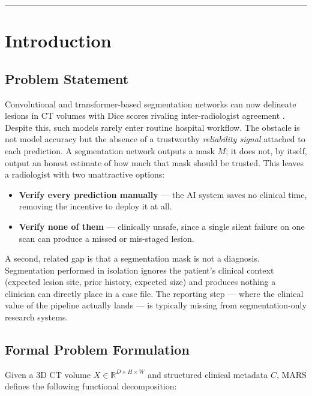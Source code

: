 \documentclass[11pt,a4paper]{article}
\begin{document}
\tableofcontents
\vspace{1em}
\hrule

\section{Introduction}
\label{sec:intro}

\subsection{Problem Statement}
Convolutional and transformer-based segmentation networks can now delineate lesions in CT volumes with Dice scores rivaling inter-radiologist agreement \cite{sam,sam2}. Despite this, such models rarely enter routine hospital workflow. The obstacle is not model accuracy but the absence of a trustworthy \emph{reliability signal} attached to each prediction. A segmentation network outputs a mask $M$; it does not, by itself, output an honest estimate of how much that mask should be trusted. This leaves a radiologist with two unattractive options:

\begin{itemize}[leftmargin=1.4em]
    \item \textbf{Verify every prediction manually} --- the AI system saves no clinical time, removing the incentive to deploy it at all.
    \item \textbf{Verify none of them} --- clinically unsafe, since a single silent failure on one scan can produce a missed or mis-staged lesion.
\end{itemize}

A second, related gap is that a segmentation mask is not a diagnosis. Segmentation performed in isolation ignores the patient's clinical context (expected lesion site, prior history, expected size) and produces nothing a clinician can directly place in a case file. The reporting step --- where the clinical value of the pipeline actually lands --- is typically missing from segmentation-only research systems.

\subsection{Formal Problem Formulation}
Given a 3D CT volume $X \in \mathbb{R}^{D\times H\times W}$ and structured clinical metadata $C$, MARS defines the following functional decomposition:
\end{document}
